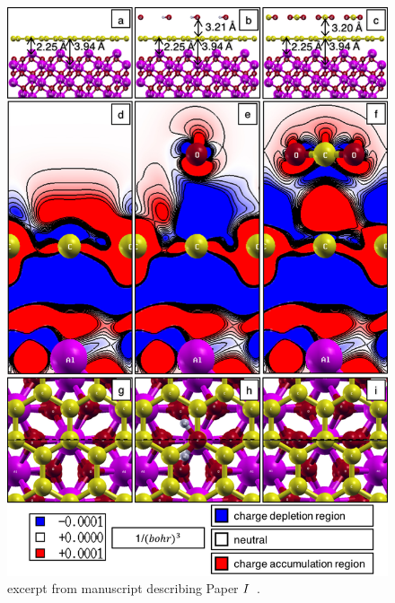 \begin{figure}
    \centering
    \includegraphics[scale=0.9,keepaspectratio]{Figs/Paper1c.jpg} %
    \caption{excerpt from manuscript describing Paper \hyperref[P1]{$\Rmnum{1}$}~\cite{Elgammal2017}.}
    \label{paper1c}
\end{figure}

